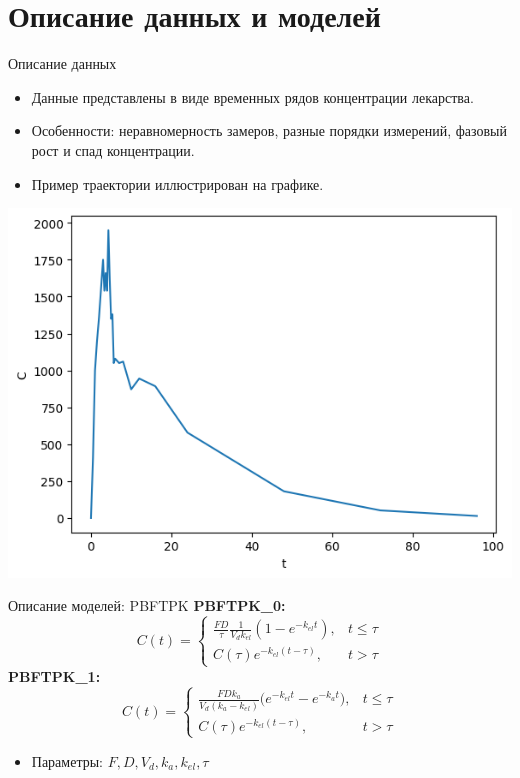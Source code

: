 \documentclass{beamer}
\begin{document}
\section{Описание данных и моделей}
\begin{frame}{Описание данных}
	\begin{itemize}
		\item Данные представлены в виде временных рядов концентрации лекарства.
		\item Особенности: неравномерность замеров, разные порядки измерений, фазовый рост и спад концентрации.
		\item Пример траектории иллюстрирован на графике.
	\end{itemize}
	\begin{center}
		\includegraphics[width=0.6\linewidth]{sample.png}
	\end{center}
\end{frame}

\begin{frame}{Описание моделей: PBFTPK}
	\textbf{PBFTPK\_0:}
	\[
		C(t) =
		\begin{cases}
			\frac{FD}{\tau} \frac{1}{V_d k_{el}} (1 - e^{-k_{el} t}), & t \leq \tau \\
			C(\tau)e^{-k_{el}(t-\tau)},                               & t > \tau
		\end{cases}
	\]
	\vspace{0.5em}
	\textbf{PBFTPK\_1:}
	\[
		C(t) =
		\begin{cases}
			\frac{FD k_a}{V_d (k_a - k_{el})} \Big(e^{-k_{el}t} - e^{-k_a t}\Big), & t \leq \tau \\
			C(\tau)e^{-k_{el}(t-\tau)},                                            & t > \tau
		\end{cases}
	\]
	\begin{itemize}
		\item Параметры: \( F, D, V_d, k_a, k_{el}, \tau \)
	\end{itemize}
\end{frame}
\end{document}
